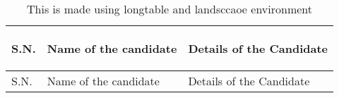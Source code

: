 \documentclass{article}
\begin{document}
	\begin{landscape}
			\begin{longtable}{|p{2cm}| p{4cm}| p{12cm}|}
				\caption{This is made using longtable and landsccaoe environment} \\
				\hline
				\label{T3}
				
				S.N.   & Name of the candidate & Details of the Candidate \\     \hline
				
				
				\endfirsthead
				
				\hline
				S.N.   & Name of the candidate & Details of the Candidate \\
				

\end{longtable}
\end{landscape}
\end{document}
